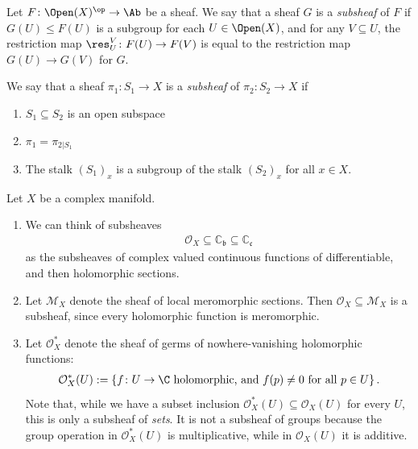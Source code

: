 \documentclass[11pt]{book}
\begin{document}
\begin{definition}[Subsheaf] Let $F \colon \Open(X)^\op \to \Ab$ be a sheaf. We say that a sheaf $G$ is a \emph{subsheaf} of $F$ if $G(U) \le F(U)$ is a subgroup for each $U\in \Open(X)$, and for any $V \subseteq U$, the restriction map $\res_U^V \colon F(U) \to F(V)$ is equal to the restriction map $G(U)\to G(V)$ for $G$.
\end{definition}

\begin{definition} We say that a sheaf $\pi_1 \colon S_1 \to X$ is a \emph{subsheaf} of $\pi_2 \colon S_2 \to X$ if
\begin{enumerate}
    \item $S_1 \subseteq S_2$ is an open subspace
    \item $\pi_1 = \pi_{2 | S_1}$
    \item The stalk $(S_1)_x$ is a subgroup of the stalk $(S_2)_x$ for all $x\in X$.
\end{enumerate}
\end{definition}

\begin{example}\label{exa:subsheaves-examples} Let $X$ be a complex manifold.
\begin{enumerate}
    \item We can think of subsheaves
    \begin{align*}
        \mathcal{O}_X \subseteq \mathbb{C}_\mathfrak{b} \subseteq \mathbb{C}_\mathfrak{c}
    \end{align*}
    as the subsheaves of complex valued continuous functions of differentiable, and then holomorphic sections.
    \item Let $\mathcal{M}_X$ denote the sheaf of local meromorphic sections. Then $\mathcal{O}_X \subseteq \mathcal{M}_X$ is a subsheaf, since every holomorphic function is meromorphic.

    \item Let $\mathcal{O}_X^\ast$ denote the sheaf of germs of nowhere-vanishing holomorphic functions:
    \begin{align*}
        \mathcal{O}_X^\ast(U) := \left\{ f \colon U \to \C \text{ holomorphic, and } f(p)\ne 0 \text{ for all } p\in U \right\}.
    \end{align*}
    Note that, while we have a subset inclusion $\mathcal{O}_X^\ast(U) \subseteq \mathcal{O}_X(U)$ for every $U$, this is only a subsheaf of \emph{sets}. It is not a subsheaf of groups because the group operation in $\mathcal{O}_X^\ast(U)$ is multiplicative, while in $\mathcal{O}_X(U)$ it is additive.
\end{enumerate}
\end{example}
\end{document}
